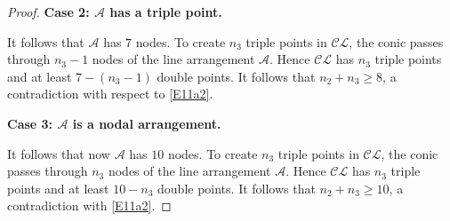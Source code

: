 \documentclass[10pt,a4paper]{amsart}
\newcommand{\A}{{\mathcal A}}
\begin{document}
\begin{proof}
\medskip

{\bf Case 2: $\mathcal{A}$  has a triple point.}

\medskip

It follows that $\mathcal{A}$ has $7$ nodes. To create $n_3$ triple points in $\mathcal{CL}$, the conic passes through $n_3-1$ nodes of the line arrangement $\A$. Hence $\mathcal{CL}$ has $n_3$ triple points and at least $7-(n_3-1)$ double points. It follows that $n_2+n_3 \geq 8$, a contradiction with respect to \eqref{E11a2}.

\medskip

{\bf Case 3: $\mathcal{A}$ is a nodal arrangement.}

\medskip

It follows that now  $\mathcal{A}$ has $10$ nodes. To create $n_3$ triple points in $\mathcal{CL}$, the conic passes through $n_3$ nodes of the line arrangement $\mathcal{A}$. Hence $\mathcal{CL}$ has $n_3$ triple points and at least $10-n_3$ double points. It follows that $n_2+n_3 \geq 10$, a contradiction with \eqref{E11a2}.

\end{proof}
\end{document}
